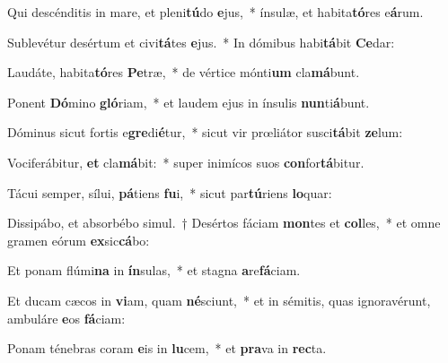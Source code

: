 \item Qui descénditis in mare, et pleni\textbf{tú}do \textbf{e}jus,~* ínsulæ, et habita\textbf{tó}res e\textbf{á}rum.
\item Sublevétur desértum et civi\textbf{tá}tes \textbf{e}jus.~* In dómibus habi\textbf{tá}bit \textbf{Ce}dar:
\item Laudáte, habita\textbf{tó}res \textbf{Pe}træ,~* de vértice mónti\textbf{um} cla\textbf{má}bunt.
\item Ponent \textbf{Dó}mino \textbf{gló}riam,~* et laudem ejus in ínsulis \textbf{nun}ti\textbf{á}bunt.
\item Dóminus sicut fortis e\textbf{gre}di\textbf{é}tur,~* sicut vir prœliátor susci\textbf{tá}bit \textbf{ze}lum:
\item Vociferábitur, \textbf{et} cla\textbf{má}bit:~* super inimícos suos \textbf{con}for\textbf{tá}bitur.
\item Tácui semper, sílui, \textbf{pá}tiens \textbf{fu}i,~* sicut par\textbf{tú}riens \textbf{lo}quar:
\item Dissipábo, et absorbébo simul.~† Desértos fáciam \textbf{mon}tes et \textbf{col}les,~* et omne gramen eórum \textbf{ex}sic\textbf{cá}bo:
\item Et ponam flúmi\textbf{na} in \textbf{ín}sulas,~* et stagna \textbf{a}re\textbf{fá}ciam.
\item Et ducam cæcos in \textbf{vi}am, quam \textbf{né}sciunt,~* et in sémitis, quas ignoravérunt, ambuláre \textbf{e}os \textbf{fá}ciam:
\item Ponam ténebras coram \textbf{e}is in \textbf{lu}cem,~* et \textbf{pra}va in \textbf{rec}ta.
